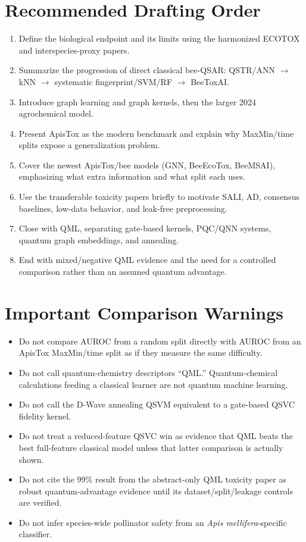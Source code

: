 \documentclass[11pt]{article}
\begin{document}
\section{Recommended Drafting Order}

\begin{enumerate}
    \item Define the biological endpoint and its limits using the harmonized ECOTOX and interspecies-proxy papers.
    \item Summarize the progression of direct classical bee-QSAR: QSTR/ANN $\rightarrow$ kNN $\rightarrow$ systematic fingerprint/SVM/RF $\rightarrow$ BeeToxAI.
    \item Introduce graph learning and graph kernels, then the larger 2024 agrochemical model.
    \item Present ApisTox as the modern benchmark and explain why MaxMin/time splits expose a generalization problem.
    \item Cover the newest ApisTox/bee models (GNN, BeeEcoTox, BeeMSAI), emphasizing what extra information and what split each uses.
    \item Use the transferable toxicity papers briefly to motivate SALI, AD, consensus baselines, low-data behavior, and leak-free preprocessing.
    \item Close with QML, separating gate-based kernels, PQC/QNN systems, quantum graph embeddings, and annealing.
    \item End with mixed/negative QML evidence and the need for a controlled comparison rather than an assumed quantum advantage.
\end{enumerate}

\section{Important Comparison Warnings}

\begin{itemize}
    \item Do not compare AUROC from a random split directly with AUROC from an ApisTox MaxMin/time split as if they measure the same difficulty.
    \item Do not call quantum-chemistry descriptors ``QML.'' Quantum-chemical calculations feeding a classical learner are not quantum machine learning.
    \item Do not call the D-Wave annealing QSVM equivalent to a gate-based QSVC fidelity kernel.
    \item Do not treat a reduced-feature QSVC win as evidence that QML beats the best full-feature classical model unless that latter comparison is actually shown.
    \item Do not cite the 99\% result from the abstract-only QML toxicity paper as robust quantum-advantage evidence until its dataset/split/leakage controls are verified.
    \item Do not infer species-wide pollinator safety from an \textit{Apis mellifera}-specific classifier.
\end{itemize}
\end{document}
